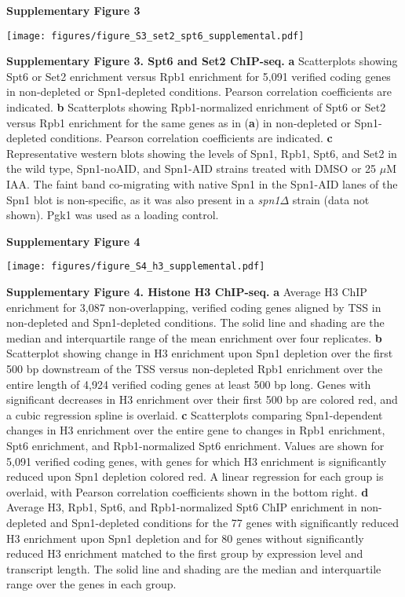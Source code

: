 \documentclass[9pt]{extarticle}
\begin{document}
\newpage

\textbf{\large Supplementary Figure 3}

{\texttt{[image: figures/figure\_S3\_set2\_spt6\_supplemental.pdf]}\par}

\textbf{Supplementary Figure 3. Spt6 and Set2 ChIP-seq.}
\textbf{a} Scatterplots showing Spt6 or Set2 enrichment versus Rpb1 enrichment for 5,091 verified coding genes in non-depleted or Spn1-depleted conditions.
Pearson correlation coefficients are indicated.
\textbf{b} Scatterplots showing Rpb1-normalized enrichment of Spt6 or Set2 versus Rpb1 enrichment for the same genes as in (\textbf{a}) in non-depleted or Spn1-depleted conditions.
Pearson correlation coefficients are indicated.
\textbf{c} Representative western blots showing the levels of Spn1, Rpb1, Spt6, and Set2 in the wild type, Spn1-noAID, and Spn1-AID strains treated with DMSO or 25 $\mu$M IAA.
The faint band co-migrating with native Spn1 in the Spn1-AID lanes of the Spn1 blot is non-specific, as it was also present in a \textit{spn1$\Delta$} strain (data not shown).
Pgk1 was used as a loading control.

\newpage

\textbf{\large Supplementary Figure 4}

{\texttt{[image: figures/figure\_S4\_h3\_supplemental.pdf]}\par}

\textbf{Supplementary Figure 4. Histone H3 ChIP-seq.}
\textbf{a} Average H3 ChIP enrichment for 3,087 non-overlapping, verified coding genes aligned by TSS in non-depleted and Spn1-depleted conditions.
The solid line and shading are the median and interquartile range of the mean enrichment over four replicates.
\textbf{b} Scatterplot showing change in H3 enrichment upon Spn1 depletion over the first 500 bp downstream of the TSS versus non-depleted Rpb1 enrichment over the entire length of 4,924 verified coding genes at least 500 bp long.
Genes with significant decreases in H3 enrichment over their first 500 bp are colored red, and a cubic regression spline is overlaid.
\textbf{c} Scatterplots comparing Spn1-dependent changes in H3 enrichment over the entire gene to changes in Rpb1 enrichment, Spt6 enrichment, and Rpb1-normalized Spt6 enrichment.
Values are shown for 5,091 verified coding genes, with genes for which H3 enrichment is significantly reduced upon Spn1 depletion colored red.
A linear regression for each group is overlaid, with Pearson correlation coefficients shown in the bottom right.
\textbf{d} Average H3, Rpb1, Spt6, and Rpb1-normalized Spt6 ChIP enrichment in non-depleted and Spn1-depleted conditions for the 77 genes with significantly reduced H3 enrichment upon Spn1 depletion and for 80 genes without significantly reduced H3 enrichment matched to the first group by expression level and transcript length.
The solid line and shading are the median and interquartile range over the genes in each group.
\end{document}
